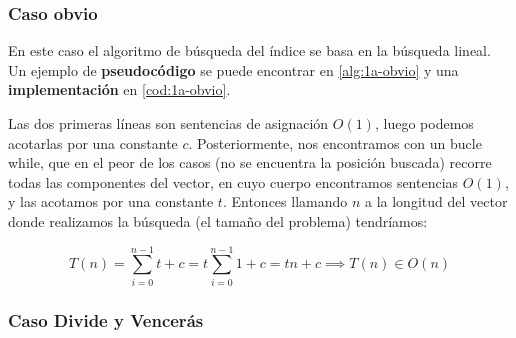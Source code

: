 \subsubsection{Caso obvio} \label{sec:1a-obvio}

En este caso el algoritmo de búsqueda del índice se basa en la búsqueda lineal. Un ejemplo de \textbf{pseudocódigo} 
se puede encontrar en \ref{alg:1a-obvio} y una \textbf{implementación} en \ref{cod:1a-obvio}.





 


Las dos primeras líneas son sentencias de asignación $O(1)$, luego podemos acotarlas por una constante $c$. 
Posteriormente, nos encontramos con un bucle while, que en el peor de los casos (no se encuentra la posición buscada) 
recorre todas las componentes del vector, en cuyo cuerpo encontramos sentencias $O(1)$, y las acotamos por una constante $t$.
Entonces llamando $n$ a la longitud del vector donde realizamos la búsqueda (el tamaño del problema) tendríamos: 


\begin{equation}
    T(n) = \sum_{i=0}^{n-1} t + c = t \sum_{i=0}^{n-1} 1 + c = tn + c \implies \boxed{T(n) \in O(n)}
\end{equation}




\subsubsection{Caso Divide y Vencerás} \label{sec:1a-dyv}

